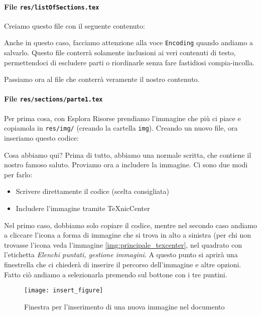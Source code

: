 \paragraph*{File \texttt{res/listOfSections.tex}} Creiamo questo file con il
seguente contenuto:



\noindent Anche in questo caso, facciamo attenzione alla voce \texttt{Encoding}
quando andiamo a salvarlo. Questo file conterrà solamente inclusioni ai veri
contenuti di testo, permettendoci di escludere parti o riordinarle senza fare
fastidiosi compia-incolla.

Passiamo ora al file che conterrà veramente il nostro contenuto.

\paragraph*{File \texttt{res/sections/parte1.tex}} Per prima cosa, con Esplora
Risorse prendiamo l'immagine che più ci piace e copiamola in \texttt{res/img/}
(creando la cartella \texttt{img}). Creando un nuovo file, ora inseriamo questo
codice:



\noindent Cosa abbiamo qui? Prima di tutto, abbiamo una normale scritta, che
contiene il nostro famoso saluto. Proviamo ora a includere la immagine.
Ci sono due modi per farlo:
\begin{itemize}
 \item Scrivere direttamente il codice (scelta consigliata)
 \item Includere l'immagine tramite TeXnicCenter
\end{itemize}

Nel primo caso, dobbiamo solo copiare il codice, mentre nel secondo caso
andiamo a cliccare l'icona a forma di immagine che si trova in alto a sinistra
(per chi non trovasse l'icona veda l'immagine \ref{img:principale_texcenter},
nel quadrato con l'etichetta \textit{Elenchi puntati, gestione immagini}.
A questo punto si aprirà una finestrella che ci chiederà di inserire il
percorso dell'immagine e altre opzioni. Fatto ciò andiamo a selezionarla
premendo sul bottone con i tre puntini.

\begin{figure}[H]
 \centering
 \texttt{[image: insert\_figure]}
 \caption{Finestra per l'inserimento di una nuova immagine nel documento}
 \label{img:insert_figure}
\end{figure}

